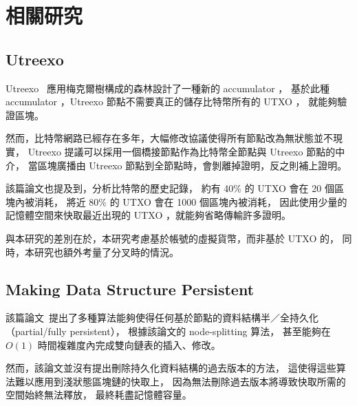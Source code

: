 \chapter{相關研究}
\label{c:related}

\section{Utreexo}
Utreexo~\cite{dryja2019utreexo} 應用梅克爾樹構成的森林設計了一種新的 accumulator ，
基於此種 accumulator ，Utreexo 節點不需要真正的儲存比特幣所有的 UTXO ，
就能夠驗證區塊。

然而，比特幣網路已經存在多年，大幅修改協議使得所有節點改為無狀態並不現實，
Utreexo 提議可以採用一個橋接節點作為比特幣全節點與 Utreexo 節點的中介，
當區塊廣播由 Utreexo 節點到全節點時，會剝離掉證明，反之則補上證明。

該篇論文也提及到，分析比特幣的歷史記錄，
約有 40\% 的 UTXO 會在 20 個區塊內被消耗，
將近 80\% 的 UTXO 會在 1000 個區塊內被消耗，
因此使用少量的記憶體空間來快取最近出現的 UTXO ，就能夠省略傳輸許多證明。

與本研究的差別在於，本研究考慮基於帳號的虛擬貨幣，而非基於 UTXO 的，
同時，本研究也額外考量了分叉時的情況。

\section{Making Data Structure Persistent}
該篇論文~\cite{driscoll1986making}提出了多種算法能夠使得任何基於節點的資料結構半／全持久化（partial/fully persistent），
根據該論文的 node-splitting 算法，
甚至能夠在 $O(1)$ 時間複雜度內完成雙向鏈表的插入、修改。

然而，該論文並沒有提出刪除持久化資料結構的過去版本的方法，
這使得這些算法難以應用到淺狀態區塊鏈的快取上，
因為無法刪除過去版本將導致快取所需的空間始終無法釋放，
最終耗盡記憶體容量。